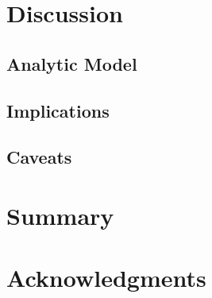 \documentclass[useAMS,usenatbib]{mn2e}
\begin{document}
% 
\section{Discussion}
\label{sec:discussion}
\subsection{Analytic Model}
\subsection{Implications}
\subsection{Caveats}

% 
\section{Summary}

% 
\section*{Acknowledgments}
%
%
\end{document}
